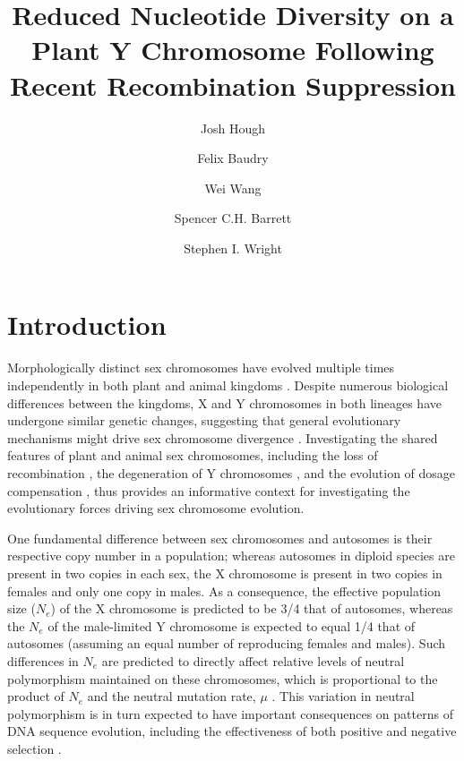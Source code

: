 \documentclass[9pt,twocolumn,twoside]{gsajnl}
\title{Reduced Nucleotide Diversity on a Plant Y Chromosome Following Recent Recombination Suppression}
\author[$\ast$,$\dagger$,1]{Josh Hough}
\author[$\dagger$]{Felix Baudry}
\author[$\dagger$]{Wei Wang}
\author[$\dagger$]{Spencer C.H. Barrett}
\author[$\dagger$]{Stephen I. Wright}
\affil[$\ast$]{Department of Plant Sciences, University of California, Davis}
\affil[$\dagger$]{Department of Ecology and Evolutionary Biology, University of Toronto}
\begin{document}
\maketitle
\thispagestyle{firststyle}
\marginmark
\firstpagefootnote
{}
\vspace{-11pt}%

\section*{Introduction}

\lettrine[lines=2]{\color{color2}M}{}orphologically distinct sex chromosomes have evolved multiple times independently in both plant and animal kingdoms \citep{westergaard1958,ohno1967,bull1983,charlesworth1991}. Despite numerous biological differences between the kingdoms, X and Y chromosomes in both lineages have undergone similar genetic changes, suggesting that general evolutionary mechanisms might drive sex chromosome divergence \citep{charlesworth1978,charlesworth1996CB,charlesworth2000degeneration}. Investigating the shared features of plant and animal sex chromosomes, including the loss of recombination \citep{bergero2009}, the degeneration of Y chromosomes \citep{hough2014,bergero2015}, and the evolution of dosage compensation \citep{muyle2012,papadopulos2015}, thus provides an informative context for investigating the evolutionary forces driving sex chromosome evolution.

One fundamental difference between sex chromosomes and autosomes is their respective copy number in a population; whereas autosomes in diploid species are present in two copies in each sex, the X chromosome is present in two copies in females and only one copy in males. As a consequence, the effective population size ($N_{e}$) of the X chromosome is predicted to be 3/4 that of autosomes, whereas the $N_{e}$ of the male-limited Y chromosome is expected to equal 1/4 that of autosomes (assuming an equal number of reproducing females and males). Such differences in $N_{e}$ are predicted to directly affect relative levels of neutral polymorphism maintained on these chromosomes, which is proportional to the product of $N_{e}$ and the neutral mutation rate, $\mu$ \citep{Kimura1984}. This variation in neutral polymorphism is in turn expected to have important consequences on patterns of DNA sequence evolution, including the effectiveness of both positive and negative selection \citep{charlesworth1987}.
\end{document}
